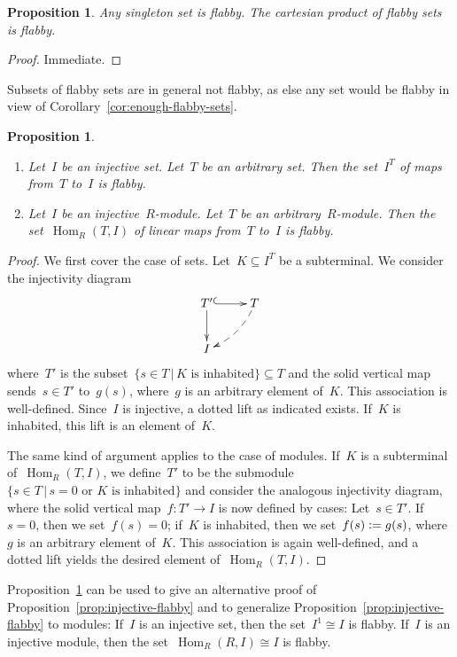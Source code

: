 \documentclass[oneside]{amsart}
\theoremstyle{definition}
\theoremstyle{plain}
\newtheorem{prop}[defn]{Proposition}
\theoremstyle{remark}
\newcommand{\defeq}{\vcentcolon=}
\DeclareMathOperator{\Hom}{Hom}
\renewcommand{\_}{\mathpunct{.}\,}
\begin{document}
\begin{prop}Any singleton set is flabby. The cartesian product of flabby sets
is flabby.\end{prop}

\begin{proof}Immediate.\end{proof}

Subsets of flabby sets are in general not flabby, as else any set would be
flabby in view of Corollary~\ref{cor:enough-flabby-sets}.

\begin{prop}\label{prop:hom-flabby}
\begin{enumerate}
\item Let~$I$ be an injective set. Let~$T$ be an arbitrary set. Then the
set~$I^T$ of maps from~$T$ to~$I$ is flabby.
\item Let~$I$ be an injective~$R$-module. Let~$T$ be an arbitrary~$R$-module. Then the
set~$\Hom_R(T,I)$ of linear maps from~$T$ to~$I$ is flabby.
\end{enumerate}\end{prop}

\begin{proof}We first cover the case of sets. Let~$K \subseteq I^T$ be a
subterminal. We consider the injectivity diagram
\[ \xymatrix{
  T' \ar@{^{(}->}[r]\ar[d] & T \ar@{-->}@/^/[ld] \\
  I
} \]
where~$T'$ is the subset~$\{ s \in T \,|\, \text{$K$ is inhabited} \} \subseteq T$ and the
solid vertical map sends~$s \in T'$ to~$g(s)$, where~$g$ is an arbitrary element
of~$K$. This association is well-defined. Since~$I$ is injective, a dotted lift
as indicated exists. If~$K$ is inhabited, this lift is an element of~$K$.

The same kind of argument applies to the case of modules. If~$K$ is a
subterminal of~$\Hom_R(T,I)$, we define~$T'$ to be the submodule
$\{ s \in T \,|\, \text{$s = 0$ or $K$ is inhabited} \}$ and consider the
analogous injectivity diagram, where the solid vertical map~$f : T' \to I$ is now
defined by cases: Let~$s \in T'$. If~$s = 0$, then we set~$f(s) = 0$; if~$K$ is
inhabited, then we set~$f(s) \defeq g(s)$, where~$g$ is an arbitrary element
of~$K$. This association is again well-defined, and a dotted lift yields the
desired element of~$\Hom_R(T,I)$.
\end{proof}

Proposition~\ref{prop:hom-flabby} can be used to give an alternative proof of
Proposition~\ref{prop:injective-flabby} and to generalize
Proposition~\ref{prop:injective-flabby} to modules: If~$I$ is an injective set,
then the set~$I^1 \cong I$ is flabby. If~$I$ is an injective module, then the
set~$\Hom_R(R,I) \cong I$ is flabby.
\end{document}
